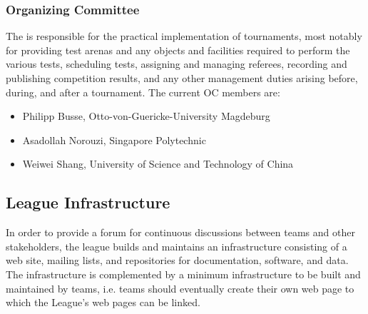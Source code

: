 \subsubsection{Organizing Committee}
The  is responsible for the practical implementation of tournaments, most notably for providing test arenas and any objects and facilities required to perform the various tests, scheduling tests, assigning and managing referees, recording and publishing competition results, and any other management duties arising before, during, and after a tournament. The current OC members are:

\begin{itemize}
	\item Philipp Busse, Otto-von-Guericke-University Magdeburg
	\item Asadollah Norouzi, Singapore Polytechnic
	\item Weiwei Shang, University of Science and Technology of China
\end{itemize}





\subsection{League Infrastructure}
In order to provide a forum for continuous discussions between teams and other stakeholders, the league builds and maintains an infrastructure consisting of a web site, mailing lists, and repositories for documentation, software, and data. The infrastructure is complemented by a minimum infrastructure to be built and maintained by teams, i.e. teams should eventually create their own web page to which the \RCAW League’s web pages can be linked.

